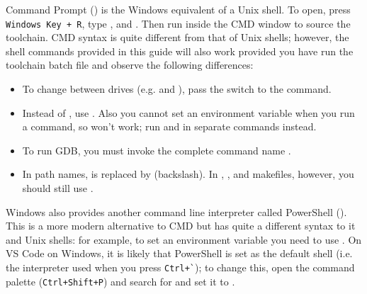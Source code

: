 Command Prompt () is the Windows equivalent of a Unix
shell. To open, press \verb|Windows Key + R|, type ,
and . Then run
 inside
the CMD window to source the toolchain. CMD syntax is quite different
from that of Unix shells; however, the shell commands provided in this
guide will also work provided you have run the toolchain batch file
and observe the following differences:
\begin{itemize}
\item To change between drives (e.g.  and ), pass the
 switch to the  command.
\item Instead of , use .
Also you cannot set an environment variable when you run a command, so
 won't work; run  and  in
separate commands instead.
\item To run GDB, you must invoke the complete command name
.
\item In path names, \file{/} is replaced by \file{\textbackslash}
(backslash). In , , and makefiles, however, you
should still use \file{/}.
\end{itemize}

Windows also provides another command line interpreter called
PowerShell (). This is a more modern alternative to CMD
but has quite a different syntax to it and Unix shells: for example,
to set an environment variable you need to use . On VS Code on Windows, it is likely that PowerShell is set as
the default shell (i.e. the interpreter used when you press
\verb|Ctrl+`|); to change this, open the command palette
(\verb|Ctrl+Shift+P|) and search for
 and set it to .
